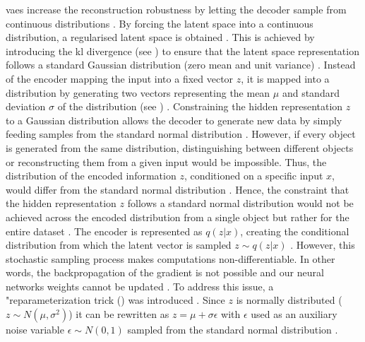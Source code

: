 \glspl{vae} increase the reconstruction robustness by letting the decoder sample from continuous distributions \cite{kingma2013AutoEncodingVariationalBayes}.
By forcing the latent space into a continuous distribution, a regularised latent space is obtained \cite{rocca2019UnderstandingVariationalAutoencoders}.
This is achieved by introducing the \gls{kl} divergence (see ) to ensure that the latent space representation follows a standard Gaussian distribution (zero mean and unit variance) \cite{razghandi2022VariationalAutoencoderGenerativea, aggarwal2018NeuralNetworksDeep}.
Instead of the encoder mapping the input into a fixed vector $z$, it is mapped into a distribution by generating two vectors representing the mean $\mu$ and standard deviation $\sigma$ of the distribution (see ) \cite{razghandi2022VariationalAutoencoderGenerativea, aggarwal2018NeuralNetworksDeep}.
Constraining the hidden representation $z$ to a Gaussian distribution allows the decoder to generate new data by simply feeding samples from the standard normal distribution \cite{aggarwal2018NeuralNetworksDeep}.
However, if every object is generated from the same distribution, distinguishing between different objects or reconstructing them from a given input would be impossible.
Thus, the distribution of the encoded information $z$, conditioned on a specific input $x$, would differ from the standard normal distribution \cite{aggarwal2018NeuralNetworksDeep}. %
Hence, the constraint that the hidden representation $z$ follows a standard normal distribution would not be achieved across the encoded distribution from a single object but rather for the entire dataset \cite{aggarwal2018NeuralNetworksDeep}.
The encoder is represented as $q(z|x)$, creating the conditional distribution from which the latent vector is sampled $z\sim q(z|x)$ \cite{kingma2013AutoEncodingVariationalBayes}.
However, this stochastic sampling process makes computations non-differentiable.
In other words, the backpropagation of the gradient is not possible and our neural networks weights cannot be updated \cite{aggarwal2018NeuralNetworksDeep}.
To address this issue, a "reparameterization trick () was introduced \cite[p. 4]{kingma2013AutoEncodingVariationalBayes}.
Since $z$ is normally distributed ($z\sim N(\mu,\sigma^2)$) it can be rewritten as $z=\mu+\sigma\epsilon$ with $\epsilon$ used as an auxiliary noise variable $\epsilon \sim N(0,1)$ sampled from the standard normal distribution \cite{kingma2013AutoEncodingVariationalBayes}.

